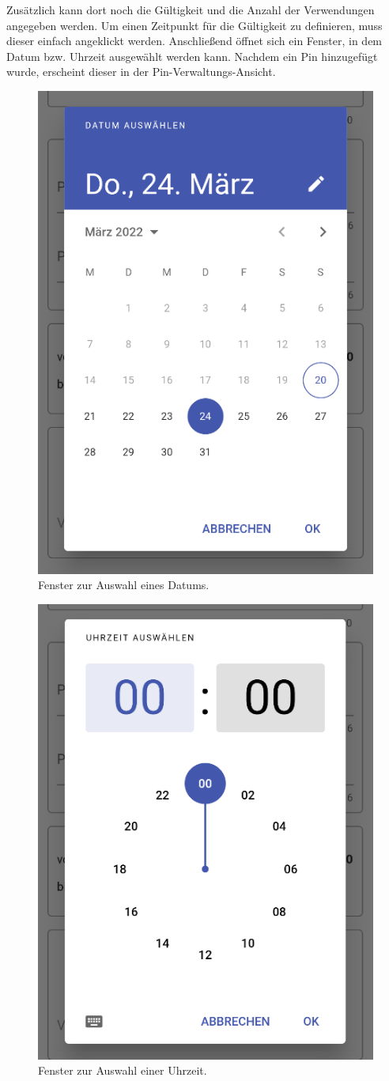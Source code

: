 Zusätzlich kann dort noch die Gültigkeit und die Anzahl der Verwendungen angegeben werden.
Um einen Zeitpunkt für die Gültigkeit zu definieren, muss dieser einfach angeklickt werden.
Anschließend öffnet sich ein Fenster, in dem Datum bzw. Uhrzeit ausgewählt werden kann.
Nachdem ein Pin hinzugefügt wurde, erscheint dieser in der Pin-Verwaltungs-Ansicht.

\begin{figure}[H]
    \begin{center}
        \includegraphics[width=.4\textwidth]{images/mobile/DatePicker.png}
        \caption{Fenster zur Auswahl eines Datums. }
    \end{center}
\end{figure}

\begin{figure}[H]
    \begin{center}
        \includegraphics[width=.4\textwidth]{images/mobile/TimePicker.png}
        \caption{Fenster zur Auswahl einer Uhrzeit.}
    \end{center}
\end{figure}

